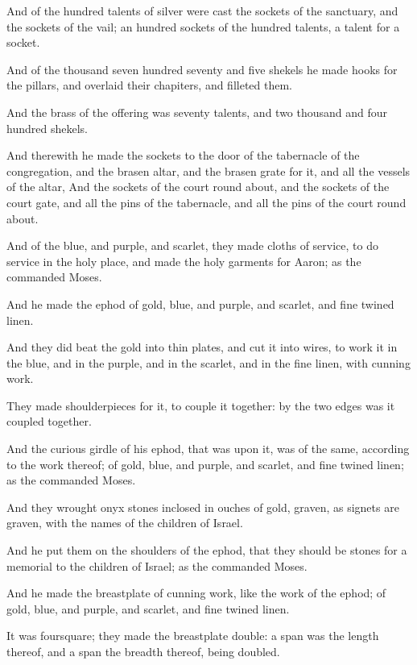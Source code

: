 \Verse And of the hundred talents of silver were cast the sockets of the sanctuary, and the sockets of the vail; an hundred sockets of the hundred talents, a talent for a socket.

\Verse And of the thousand seven hundred seventy and five shekels he made hooks for the pillars, and overlaid their chapiters, and filleted them.

\Verse And the brass of the offering was seventy talents, and two thousand and four hundred shekels.

\Verse And therewith he made the sockets to the door of the tabernacle of the congregation, and the brasen altar, and the brasen grate for it, and all the vessels of the altar, \Verse And the sockets of the court round about, and the sockets of the court gate, and all the pins of the tabernacle, and all the pins of the court round about.

\Chapter
\Verse And of the blue, and purple, and scarlet, they made cloths of service, to do service in the holy place, and made the holy garments for Aaron; as the \LORD commanded Moses.

\Verse And he made the ephod of gold, blue, and purple, and scarlet, and fine twined linen.

\Verse And they did beat the gold into thin plates, and cut it into wires, to work it in the blue, and in the purple, and in the scarlet, and in the fine linen, with cunning work.

\Verse They made shoulderpieces for it, to couple it together: by the two edges was it coupled together.

\Verse And the curious girdle of his ephod, that was upon it, was of the same, according to the work thereof; of gold, blue, and purple, and scarlet, and fine twined linen; as the \LORD commanded Moses.

\Verse And they wrought onyx stones inclosed in ouches of gold, graven, as signets are graven, with the names of the children of Israel.

\Verse And he put them on the shoulders of the ephod, that they should be stones for a memorial to the children of Israel; as the \LORD commanded Moses.

\Verse And he made the breastplate of cunning work, like the work of the ephod; of gold, blue, and purple, and scarlet, and fine twined linen.

\Verse It was foursquare; they made the breastplate double: a span was the length thereof, and a span the breadth thereof, being doubled.

